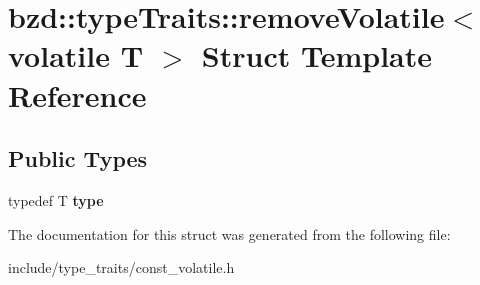 \hypertarget{structbzd_1_1typeTraits_1_1removeVolatile_3_01volatile_01T_01_4}{}\section{bzd\+:\+:type\+Traits\+:\+:remove\+Volatile$<$ volatile T $>$ Struct Template Reference}
\label{structbzd_1_1typeTraits_1_1removeVolatile_3_01volatile_01T_01_4}
\subsection*{Public Types}
\begin{DoxyCompactItemize}
\item 
\mbox{\label{structbzd_1_1typeTraits_1_1removeVolatile_3_01volatile_01T_01_4_a4c803692eca654495be7789beb8d9a13}} 
typedef T {\bfseries type}
\end{DoxyCompactItemize}


The documentation for this struct was generated from the following file\+:\begin{DoxyCompactItemize}
\item 
include/type\+\_\+traits/const\+\_\+volatile.\+h\end{DoxyCompactItemize}
